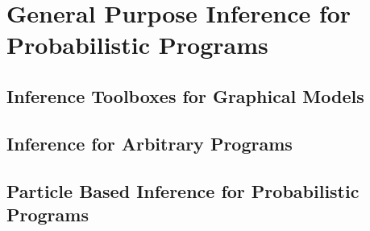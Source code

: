 
\chapter{General Purpose Inference for Probabilistic Programs}
\label{chp:proginf}

\section{Inference Toolboxes for Graphical Models}
\label{sec:proginf:tool}

\section{Inference for Arbitrary Programs}
\label{sec:proginf:inf}

\section{Particle Based Inference for Probabilistic Programs}
\label{sec:proginf:probprog}